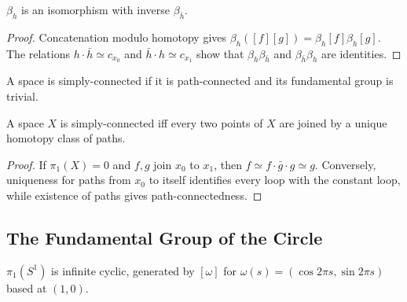 \begin{proposition}
\label{prop:change-of-basepoint-isomorphism}


$\beta_h$ is an isomorphism with inverse $\beta_{\bar h}$.
\end{proposition}

\begin{proof}
\sketch Concatenation modulo homotopy gives
$\beta_h([f][g])=\beta_h[f]\beta_h[g]$. The relations
$h\cdot\bar h\simeq c_{x_0}$ and $\bar h\cdot h\simeq c_{x_1}$ show that
$\beta_h\beta_{\bar h}$ and $\beta_{\bar h}\beta_h$ are identities.
\end{proof}

\begin{definition}
\label{def:simply-connected}



A space is simply-connected if it is path-connected and its fundamental group
is trivial.
\end{definition}

\begin{proposition}
\label{prop:simply-connected-iff-unique-path-class}



A space $X$ is simply-connected iff every two points of $X$ are joined by a
unique homotopy class of paths.
\end{proposition}

\begin{proof}
\sketch If $\pi_1(X)=0$ and $f,g$ join $x_0$ to $x_1$, then
$f\simeq f\cdot\bar g\cdot g\simeq g$. Conversely, uniqueness for paths from
$x_0$ to itself identifies every loop with the constant loop, while existence
of paths gives path-connectedness.
\end{proof}

\subsection*{The Fundamental Group of the Circle}

\begin{theorem}
\label{thm:fundamental-group-of-circle}



$\pi_1(S^1)$ is infinite cyclic, generated by $[\omega]$ for
$\omega(s)=(\cos2\pi s,\sin2\pi s)$ based at $(1,0)$.
\end{theorem}

